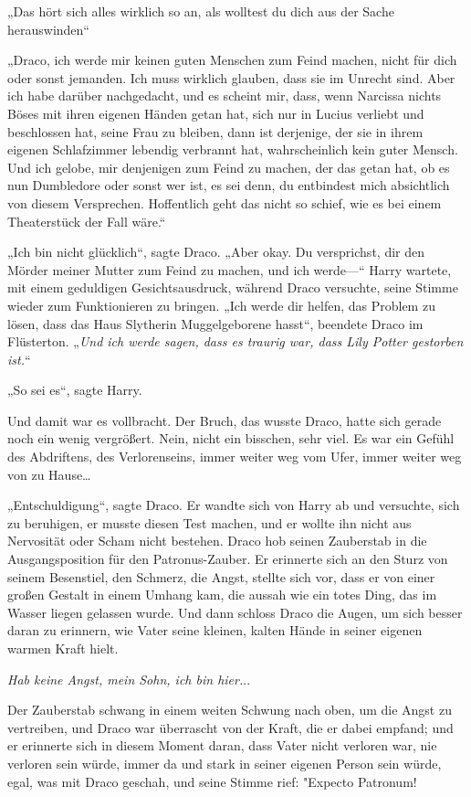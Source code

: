 {„Das hört sich alles wirklich so an, als wolltest du dich aus der Sache herauswinden“

„Draco, ich werde mir keinen guten Menschen zum Feind machen, nicht für dich oder sonst jemanden. Ich muss wirklich glauben, dass sie im Unrecht sind. Aber ich habe darüber nachgedacht, und es scheint mir, dass, wenn Narcissa nichts Böses mit ihren eigenen Händen getan hat, sich nur in Lucius verliebt und beschlossen hat, seine Frau zu bleiben, dann ist derjenige, der sie in ihrem eigenen Schlafzimmer lebendig verbrannt hat, wahrscheinlich kein guter Mensch. Und ich gelobe, mir denjenigen zum Feind zu machen, der das getan hat, ob es nun Dumbledore oder sonst wer ist, es sei denn, du entbindest mich absichtlich von diesem Versprechen. Hoffentlich geht das nicht so schief, wie es bei einem Theaterstück der Fall wäre.“

„Ich bin nicht glücklich“, sagte Draco. „Aber okay. Du versprichst, dir den Mörder meiner Mutter zum Feind zu machen, und ich werde—“ Harry wartete, mit einem geduldigen Gesichtsausdruck, während Draco versuchte, seine Stimme wieder zum Funktionieren zu bringen. „Ich werde dir helfen, das Problem zu lösen, dass das Haus Slytherin Muggelgeborene hasst“, beendete Draco im Flüsterton. „\emph{Und ich werde sagen, dass es traurig war, dass Lily Potter gestorben ist.}“

„So sei es“, sagte Harry.

Und damit war es vollbracht. Der Bruch, das wusste Draco, hatte sich gerade noch ein wenig vergrößert. Nein, nicht ein bisschen, sehr viel. Es war ein Gefühl des Abdriftens, des Verlorenseins, immer weiter weg vom Ufer, immer weiter weg von zu Hause…

„Entschuldigung“, sagte Draco. Er wandte sich von Harry ab und versuchte, sich zu beruhigen, er musste diesen Test machen, und er wollte ihn nicht aus Nervosität oder Scham nicht bestehen. Draco hob seinen Zauberstab in die Ausgangsposition für den Patronus-Zauber. Er erinnerte sich an den Sturz von seinem Besenstiel, den Schmerz, die Angst, stellte sich vor, dass er von einer großen Gestalt in einem Umhang kam, die aussah wie ein totes Ding, das im Wasser liegen gelassen wurde. Und dann schloss Draco die Augen, um sich besser daran zu erinnern, wie Vater seine kleinen, kalten Hände in seiner eigenen warmen Kraft hielt.

\emph{Hab keine Angst, mein Sohn, ich bin hier.}..

Der Zauberstab schwang in einem weiten Schwung nach oben, um die Angst zu vertreiben, und Draco war überrascht von der Kraft, die er dabei empfand; und er erinnerte sich in diesem Moment daran, dass Vater nicht verloren war, nie verloren sein würde, immer da und stark in seiner eigenen Person sein würde, egal, was mit Draco geschah, und seine Stimme rief: "Expecto Patronum!

}
